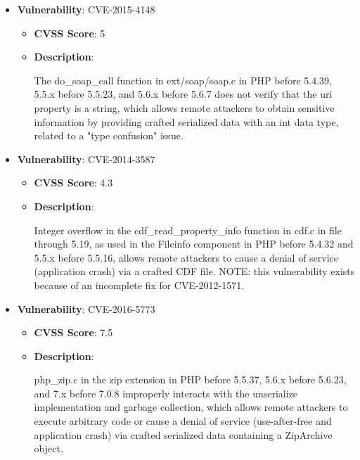 \documentclass{article}
\begin{document}
\begin{itemize}
        \item \textbf{Vulnerability}: CVE-2015-4148
        \begin{itemize}
            \item \textbf{CVSS Score}:  5 
            \item \textbf{Description}:
            \parbox[t]{0.9\linewidth}{
                \ttfamily The do\_soap\_call function in ext/soap/soap.c in PHP before 5.4.39, 5.5.x before 5.5.23, and 5.6.x before 5.6.7 does not verify that the uri property is a string, which allows remote attackers to obtain sensitive information by providing crafted serialized data with an int data type, related to a "type confusion" issue.
            }
        \end{itemize}
    
        \item \textbf{Vulnerability}: CVE-2014-3587
        \begin{itemize}
            \item \textbf{CVSS Score}:  4.3 
            \item \textbf{Description}:
            \parbox[t]{0.9\linewidth}{
                \ttfamily Integer overflow in the cdf\_read\_property\_info function in cdf.c in file through 5.19, as used in the Fileinfo component in PHP before 5.4.32 and 5.5.x before 5.5.16, allows remote attackers to cause a denial of service (application crash) via a crafted CDF file.  NOTE: this vulnerability exists because of an incomplete fix for CVE-2012-1571.
            }
        \end{itemize}
    
        \item \textbf{Vulnerability}: CVE-2016-5773
        \begin{itemize}
            \item \textbf{CVSS Score}:  7.5 
            \item \textbf{Description}:
            \parbox[t]{0.9\linewidth}{
                \ttfamily php\_zip.c in the zip extension in PHP before 5.5.37, 5.6.x before 5.6.23, and 7.x before 7.0.8 improperly interacts with the unserialize implementation and garbage collection, which allows remote attackers to execute arbitrary code or cause a denial of service (use-after-free and application crash) via crafted serialized data containing a ZipArchive object.
            }
        \end{itemize}
    

\end{itemize}
\end{document}
